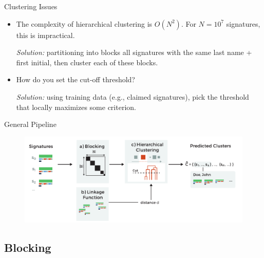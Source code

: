 \documentclass{beamer}
\begin{document}
\begin{frame}{Clustering Issues}

\begin{itemize}
\item The complexity of hierarchical clustering is {\color{red} $O(N^2)$}. For $N=10^7$ signatures, this is impractical.

{\it {\color{blue}Solution:}} partitioning into blocks all signatures with the same last name + first initial, then cluster each of these blocks.\\[2em]

\item How do you set the {\color{red} cut-off threshold}?

{\it {\color{blue}Solution:}} using training data (e.g., claimed signatures), pick the threshold that locally maximizes some criterion.
\end{itemize}

\end{frame}


\begin{frame} {General Pipeline}


\begin{figure}
   \centering
   \includegraphics[width=\textwidth]{./figures/fig-workflow.pdf}
\end{figure}

\end{frame}




\subsection{Blocking}
\end{document}
